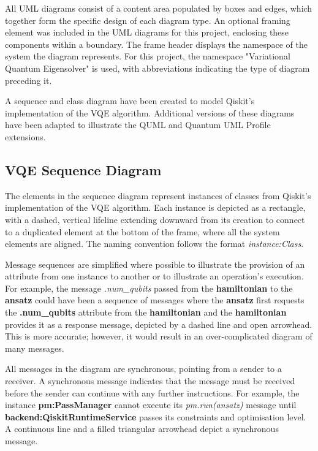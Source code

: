 \documentclass{article}
\begin{document}
All UML diagrams consist of a content area populated by boxes and edges, which together form the specific design of each diagram type. An optional framing element was included in the UML diagrams for this project, enclosing these components within a boundary. The frame header displays the namespace of the system the diagram represents\cite{UMLElementFrame}. For this project, the namespace "Variational Quantum Eigensolver" is used, with abbreviations indicating the type of diagram preceding it. 

A sequence and class diagram have been created to model Qiskit’s implementation of the VQE algorithm. Additional versions of these diagrams have been adapted to illustrate the QUML and Quantum UML Profile extensions.

\subsection{VQE Sequence Diagram}

The elements in the sequence diagram represent instances of classes from Qiskit’s implementation of the VQE algorithm. Each instance is depicted as a rectangle, with a dashed, vertical lifeline extending downward from its creation to connect to a duplicated element at the bottom of the frame, where all the system elements are aligned. The naming convention follows the format \textit{instance:Class}.

Message sequences are simplified where possible to illustrate the provision of an attribute from one instance to another or to illustrate an operation's execution. For example, the message \textit{.num\_qubits} passed from the \textbf{hamiltonian} to the \textbf{ansatz} could have been a sequence of messages where the \textbf{ansatz} first requests the \textbf{.num\_qubits} attribute from the \textbf{hamiltonian} and the \textbf{hamiltonian} provides it as a response message, depicted by a dashed line and open arrowhead. This is more accurate; however, it would result in an over-complicated diagram of many messages. 

All messages in the diagram are synchronous, pointing from a sender to a receiver. A synchronous message indicates that the message must be received before the sender can continue with any further instructions\cite{Seidl_Scholz_Huemer_Kappel_Duffy_2014}. For example, the instance \textbf{pm:PassManager} cannot execute its \textit{pm.run(ansatz)} message until \textbf{backend:QiskitRuntimeService} passes its constraints and optimisation level. A continuous line and a filled triangular arrowhead depict a synchronous message.
\end{document}
